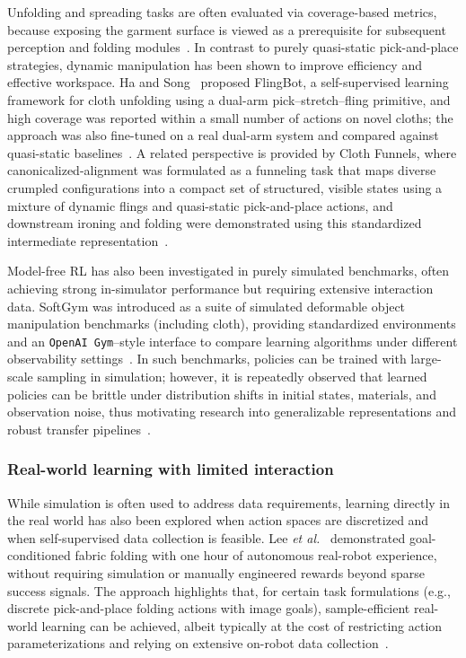 Unfolding and spreading tasks are often evaluated via coverage-based metrics, because exposing the garment surface is viewed as a prerequisite for subsequent perception and folding modules~\cite{GarciaCamacho2020ClothBenchmark,Longhini2025ClothReview}. In contrast to purely quasi-static pick-and-place strategies, dynamic manipulation has been shown to improve efficiency and effective workspace. Ha and Song~\cite{Ha2021FlingBot} proposed FlingBot, a self-supervised learning framework for cloth unfolding using a dual-arm pick--stretch--fling primitive, and high coverage was reported within a small number of actions on novel cloths; the approach was also fine-tuned on a real dual-arm system and compared against quasi-static baselines~\cite{Ha2021FlingBot}. A related perspective is provided by Cloth Funnels, where canonicalized-alignment was formulated as a funneling task that maps diverse crumpled configurations into a compact set of structured, visible states using a mixture of dynamic flings and quasi-static pick-and-place actions, and downstream ironing and folding were demonstrated using this standardized intermediate representation~\cite{Canberk2022ClothFunnels}.

Model-free \ac{RL} has also been investigated in purely simulated benchmarks, often achieving strong in-simulator performance but requiring extensive interaction data. SoftGym was introduced as a suite of simulated deformable object manipulation benchmarks (including cloth), providing standardized environments and an \texttt{OpenAI Gym}--style interface to compare learning algorithms under different observability settings~\cite{Lin2021SoftGym}. In such benchmarks, policies can be trained with large-scale sampling in simulation; however, it is repeatedly observed that learned policies can be brittle under distribution shifts in initial states, materials, and observation noise, thus motivating research into generalizable representations and robust transfer pipelines~\cite{Lin2021SoftGym,Gu2023DeformableSurvey,Lu2024GarmentLab}.

\subsubsection{Real-world learning with limited interaction}

While simulation is often used to address data requirements, learning directly in the real world has also been explored when action spaces are discretized and when self-supervised data collection is feasible. Lee \emph{et al.}~\cite{Lee2021ArbitraryGoalFolding} demonstrated goal-conditioned fabric folding with one hour of autonomous real-robot experience, without requiring simulation or manually engineered rewards beyond sparse success signals. The approach highlights that, for certain task formulations (e.g., discrete pick-and-place folding actions with image goals), sample-efficient real-world learning can be achieved, albeit typically at the cost of restricting action parameterizations and relying on extensive on-robot data collection~\cite{Lee2021ArbitraryGoalFolding,Longhini2025ClothReview}.


